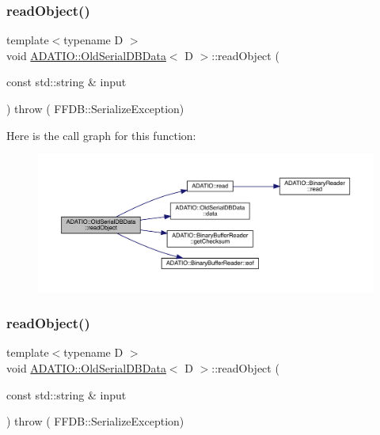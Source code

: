 \subsubsection{\texorpdfstring{readObject()}{readObject()}\hspace{0.1cm}{\footnotesize\ttfamily [1/2]}}
{\footnotesize\ttfamily template$<$typename D $>$ \\
void \mbox{\hyperlink{classADATIO_1_1OldSerialDBData}{A\+D\+A\+T\+I\+O\+::\+Old\+Serial\+D\+B\+Data}}$<$ D $>$\+::read\+Object (\begin{DoxyParamCaption}\item[{const std\+::string \&}]{input }\end{DoxyParamCaption}) throw ( F\+F\+D\+B\+::\+Serialize\+Exception) \hspace{0.3cm}{\ttfamily [inline]}}

Here is the call graph for this function\+:
\nopagebreak
\begin{figure}[H]
\begin{center}
\leavevmode
\includegraphics[width=350pt]{da/dbc/classADATIO_1_1OldSerialDBData_aad0338cd19224fe3eb6223afe7e2c2c4_cgraph}
\end{center}
\end{figure}
\mbox{\label{classADATIO_1_1OldSerialDBData_aad0338cd19224fe3eb6223afe7e2c2c4}} 
\subsubsection{\texorpdfstring{readObject()}{readObject()}\hspace{0.1cm}{\footnotesize\ttfamily [2/2]}}
{\footnotesize\ttfamily template$<$typename D $>$ \\
void \mbox{\hyperlink{classADATIO_1_1OldSerialDBData}{A\+D\+A\+T\+I\+O\+::\+Old\+Serial\+D\+B\+Data}}$<$ D $>$\+::read\+Object (\begin{DoxyParamCaption}\item[{const std\+::string \&}]{input }\end{DoxyParamCaption}) throw ( F\+F\+D\+B\+::\+Serialize\+Exception) \hspace{0.3cm}{\ttfamily [inline]}}

